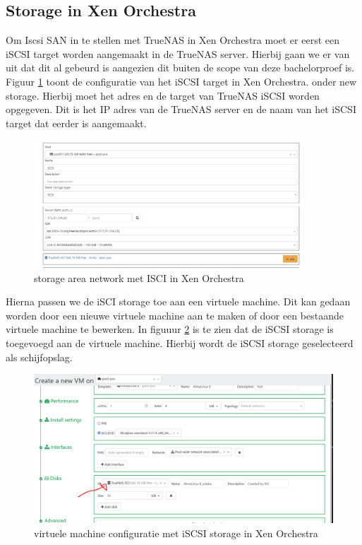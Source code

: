 \subsection{Storage in Xen Orchestra}%
\label{sec:sec:storage_orch}
Om Iscsi SAN in te stellen met TrueNAS in Xen Orchestra moet er eerst een iSCSI target worden aangemaakt in de TrueNAS server. Hierbij gaan we er van uit dat dit al gebeurd is aangezien dit  buiten de scope van deze bachelorproef is.
Figuur \ref{fig:iscsi-orch} toont de configuratie van het iSCSI target in Xen Orchestra. onder new storage. Hierbij moet het adres en de target van TrueNAS iSCSI worden opgegeven. Dit is het IP adres van de TrueNAS server en de naam van het iSCSI target dat eerder is aangemaakt.
\begin{figure}[H]
  \centering
  \includegraphics[width=0.9\textwidth, trim=0cm 0cm 20cm 0cm, clip]{../poc/iSCI-orch.png}
  \caption{storage area network met ISCI in Xen Orchestra}
  \label{fig:iscsi-orch}
\end{figure}  
Hierna passen we de iSCI storage toe aan een virtuele machine. Dit kan gedaan worden door een nieuwe virtuele machine aan te maken of door een bestaande virtuele machine te bewerken.
In figuuur \ref{fig:vm-storage-orch} is te zien dat de iSCSI storage is toegevoegd aan de virtuele machine. Hierbij wordt de iSCSI storage geselecteerd als schijfopslag.
\begin{figure}[H]
  \centering
  \includegraphics[width=1.0\textwidth, trim=0cm 0cm 15cm 0cm, clip]{../poc/isci-vm-orch.png}
  \caption{virtuele machine configuratie met iSCSI storage in Xen Orchestra}
  \label{fig:vm-storage-orch}
\end{figure}

